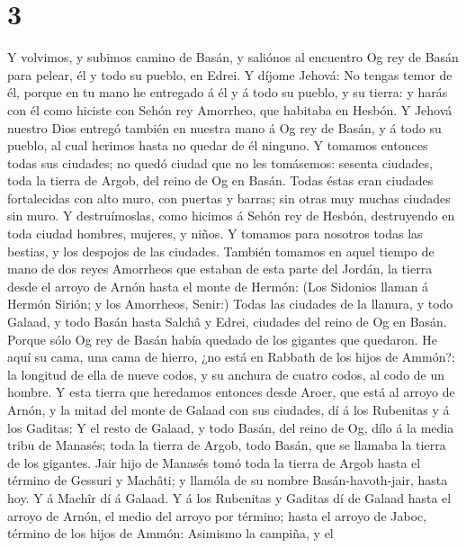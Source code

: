 \hypertarget{section-2}{%
\section{3}\label{section-2}}

 Y volvimos, y subimos camino de Basán, y saliónos al
encuentro Og rey de Basán para pelear, él y todo su pueblo, en Edrei.
 Y díjome Jehová: No tengas temor de él, porque en tu mano
he entregado á él y á todo su pueblo, y su tierra: y harás con él como
hiciste con Sehón rey Amorrheo, que habitaba en Hesbón.  Y
Jehová nuestro Dios entregó también en nuestra mano á Og rey de Basán, y
á todo su pueblo, al cual herimos hasta no quedar de él ninguno.
 Y tomamos entonces todas sus ciudades; no quedó ciudad que
no les tomásemos: sesenta ciudades, toda la tierra de Argob, del reino
de Og en Basán.  Todas éstas eran ciudades fortalecidas con
alto muro, con puertas y barras; sin otras muy muchas ciudades sin muro.
 Y destruímoslas, como hicimos á Sehón rey de Hesbón,
destruyendo en toda ciudad hombres, mujeres, y niños.  Y
tomamos para nosotros todas las bestias, y los despojos de las ciudades.
 También tomamos en aquel tiempo de mano de dos reyes
Amorrheos que estaban de esta parte del Jordán, la tierra desde el
arroyo de Arnón hasta el monte de Hermón:  (Los Sidonios
llaman á Hermón Sirión; y los Amorrheos, Senir:)  Todas las
ciudades de la llanura, y todo Galaad, y todo Basán hasta Salchâ y
Edrei, ciudades del reino de Og en Basán.  Porque sólo Og
rey de Basán había quedado de los gigantes que quedaron. He aquí su
cama, una cama de hierro, ¿no está en Rabbath de los hijos de Ammón?; la
longitud de ella de nueve codos, y su anchura de cuatro codos, al codo
de un hombre.  Y esta tierra que heredamos entonces desde
Aroer, que está al arroyo de Arnón, y la mitad del monte de Galaad con
sus ciudades, dí á los Rubenitas y á los Gaditas:  Y el
resto de Galaad, y todo Basán, del reino de Og, dílo á la media tribu de
Manasés; toda la tierra de Argob, todo Basán, que se llamaba la tierra
de los gigantes.  Jair hijo de Manasés tomó toda la tierra
de Argob hasta el término de Gessuri y Machâti; y llamóla de su nombre
Basán-havoth-jair, hasta hoy.  Y á Machîr dí á Galaad.
 Y á los Rubenitas y Gaditas dí de Galaad hasta el arroyo
de Arnón, el medio del arroyo por término; hasta el arroyo de Jaboc,
término de los hijos de Ammón:  Asimismo la campiña, y el
